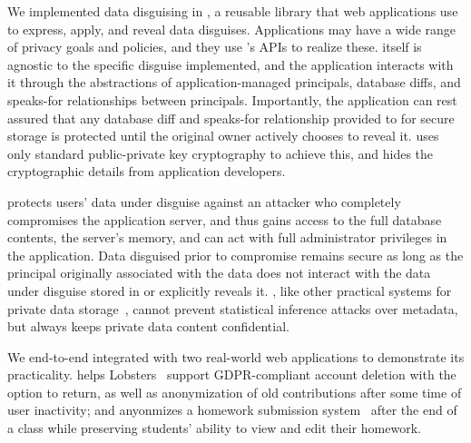 %
We implemented data disguising in \sys, a reusable library that
web applications use to express, apply, and reveal data disguises.
%
Applications may have a wide range of privacy goals and policies, and they
use \sys's APIs to realize these.
%
\sys itself is agnostic to the specific disguise implemented, and the
application interacts with it through the abstractions of application-managed
principals, database diffs, and speaks-for relationships between principals.
%
Importantly, the application can rest assured that any database diff
and speaks-for relationship provided to \sys for secure storage is protected
until the original owner actively chooses to reveal it.
%
\sys uses only standard public-private key cryptography to achieve this, and
hides the cryptographic details from application developers.
%

%
%
\sys protects users' data under disguise against an attacker who completely
compromises the application server, and thus gains access to the full database
contents, the server's memory, and can act with full administrator privileges
in the application.
%
Data disguised prior to compromise remains secure as long as the principal
originally associated with the data does not interact with the data under
disguise stored in \sys or explicitly reveals it.
%
%
\sys, like other practical systems for private data storage~\cite{cryptdb, mylar,
keybase}, cannot prevent statistical inference attacks over metadata, but always
keeps private data content confidential.
%

%
%
We end-to-end integrated \sys with two real-world web applications to demonstrate
its practicality.
%
\sys helps Lobsters~\cite{lobsters} support GDPR-compliant account deletion with
the option to return, as well as anonymization of old contributions after some
time of user inactivity; and \sys anyonmizes a homework submission
system~\cite{websubmit-rs-anon} after the end of a class while preserving
students' ability to view and edit their homework.
%

